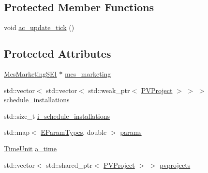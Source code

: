 \subsection*{Protected Member Functions}
{\bf }\par
\begin{DoxyCompactItemize}
\item 
void \hyperlink{classsolar__core_1_1_s_e_i_a51873235b9ab1795b5616e672c75e499}{ac\+\_\+update\+\_\+tick} ()
\end{DoxyCompactItemize}

\subsection*{Protected Attributes}
{\bf }\par
\begin{DoxyCompactItemize}
\item 
\hyperlink{classsolar__core_1_1_mes_marketing_s_e_i}{Mes\+Marketing\+S\+E\+I} $\ast$ \hyperlink{classsolar__core_1_1_s_e_i_a2092c19659e7acd194ac326ba6fbdc29}{mes\+\_\+marketing}
\end{DoxyCompactItemize}

{\bf }\par
\begin{DoxyCompactItemize}
\item 
std\+::vector$<$ std\+::vector$<$ std\+::weak\+\_\+ptr$<$ \hyperlink{classsolar__core_1_1_p_v_project}{P\+V\+Project} $>$ $>$ $>$ \hyperlink{classsolar__core_1_1_s_e_i_aacda4fae2c17d58672b60eba9c8cdc63}{schedule\+\_\+installations}
\item 
std\+::size\+\_\+t \hyperlink{classsolar__core_1_1_s_e_i_ad906dcd5b638e405a7daf14539096377}{i\+\_\+schedule\+\_\+installations}
\end{DoxyCompactItemize}

{\bf }\par
\begin{DoxyCompactItemize}
\item 
std\+::map$<$ \hyperlink{namespacesolar__core_aa1147341e5ef7a40d68d1bd68e149362}{E\+Param\+Types}, double $>$ \hyperlink{classsolar__core_1_1_s_e_i_a811b998092171224983f9aefaa974707}{params}
\item 
\hyperlink{namespacesolar__core_a4b5949d07259da6f8a20d12a30403e90}{Time\+Unit} \hyperlink{classsolar__core_1_1_s_e_i_abf17b36abf722993d5ad53710579d402}{a\+\_\+time}
\end{DoxyCompactItemize}

{\bf }\par
\begin{DoxyCompactItemize}
\item 
std\+::vector$<$ std\+::shared\+\_\+ptr$<$ \hyperlink{classsolar__core_1_1_p_v_project}{P\+V\+Project} $>$ $>$ \hyperlink{classsolar__core_1_1_s_e_i_a76d9d151e51465d534ff0fd3d64f98bc}{pvprojects}
\end{DoxyCompactItemize}

